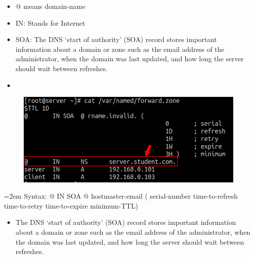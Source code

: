 \begin{flushleft}
\begin{itemize}
		\begin{itemize}
			\item @ means domain-name
			\item IN: Stands for Internet
			\item SOA: The DNS ‘start of authority’ (SOA) record stores important information about a domain or zone such as the email address of the administrator, when the domain was last updated, and how long the server should wait between refreshes.
			\item 
			
		\end{itemize}
		
		\newpage
		\begin{figure}[h!]
			\centering
			\includegraphics[scale=.4]{content/chapter3/images/zone3.png}
		\end{figure}
		\begin{tcolorbox}[breakable,notitle,boxrule=1pt,colback=pink,colframe=pink]
			\color{black}
			\font=2em
			Syntax: 
			\newline
			\color{blue}
			@   IN  SOA  @  hostmaster-email (
			\newline
			serial-number
			\newline
			time-to-refresh
			\newline
			time-to-retry
			\newline
			time-to-expire
			\newline
			minimum-TTL)
			\font=4pt
		\end{tcolorbox}	
		\begin{itemize}
			\item The DNS ‘start of authority’ (SOA) record stores important information about a domain or zone such as the email address of the administrator, when the domain was last updated, and how long the server should wait between refreshes.
		\end{itemize}			
		
	\end{itemize}
\end{flushleft}

\newpage





